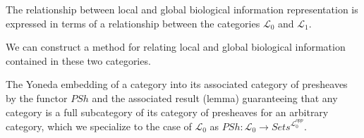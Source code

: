 \begin{frame}
\begin{block}{}
The relationship between local and global biological information representation is expressed in terms of a relationship between the categories $\mathcal{L}_0$ and $\mathcal{L}_1$. 
\end{block}
\pause \begin{block}{}
We can construct a method for relating local and global biological information contained in these two categories.
\end{block}
\pause \begin{block}{}
The Yoneda embedding of a category into its associated category of presheaves by the functor $PSh$ and the associated result (lemma) guaranteeing that any category is a full subcategory of its category of presheaves for an arbitrary category, which we specialize to the case of $\mathcal{L}_0$ as $PSh: \mathcal{L}_0 \rightarrow \textit{Sets}^{\mathcal{L}_0^{opp}}$.
\end{block}
\end{frame}